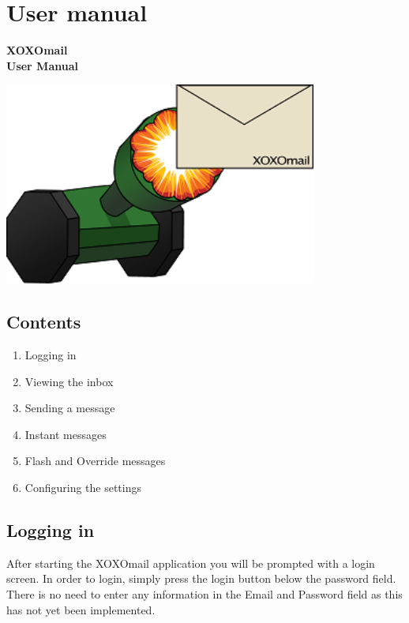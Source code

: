 \chapter{User manual}


   \begin{center}
    \vspace*{3\baselineskip}
    \large
    \bfseries
    XOXOmail\\[2\baselineskip]
    
    User Manual \\
    \normalfont
    \large
    
    	
    \includegraphics[height=18em]{login_screen}
  \end{center}

\newpage

\section*{Contents}
\begin{enumerate}
\item{}Logging in
\item{}Viewing the inbox
\item{}Sending a message
\item{}Instant messages
\item{}Flash and Override messages
\item{}Configuring the settings
\end{enumerate}

\newpage
\section*{Logging in}

After starting the XOXOmail application you will be prompted with a login screen. In order to login, simply press the login button below the password field. There is no need to enter any information in the Email and Password field as this has not yet been implemented. 

